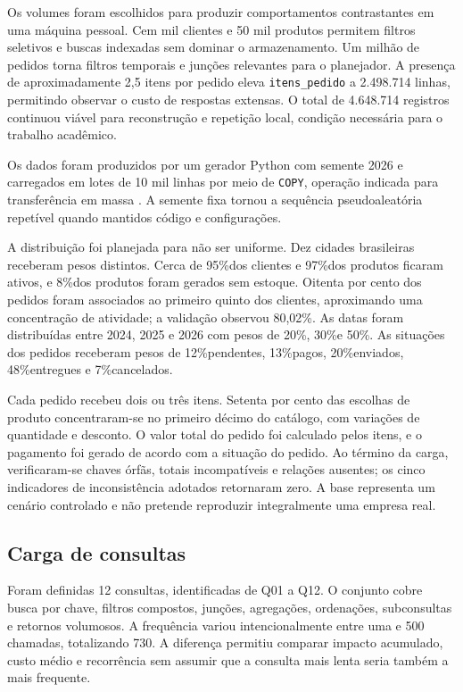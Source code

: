 \documentclass{UNESC}
\newcommand{\codigo}[1]{\texttt{#1}}
\newcommand{\perc}{\%}
\begin{document}
Os volumes foram escolhidos para produzir comportamentos contrastantes em uma máquina pessoal. Cem mil clientes e 50 mil produtos permitem filtros seletivos e buscas indexadas sem dominar o armazenamento. Um milhão de pedidos torna filtros temporais e junções relevantes para o planejador. A presença de aproximadamente 2,5 itens por pedido eleva \codigo{itens\_pedido} a 2.498.714 linhas, permitindo observar o custo de respostas extensas. O total de 4.648.714 registros continuou viável para reconstrução e repetição local, condição necessária para o trabalho acadêmico.

Os dados foram produzidos por um gerador Python com semente 2026 e carregados em lotes de 10 mil linhas por meio de \codigo{COPY}, operação indicada para transferência em massa \cite{postgresql2026copy}. A semente fixa tornou a sequência pseudoaleatória repetível quando mantidos código e configurações.

A distribuição foi planejada para não ser uniforme. Dez cidades brasileiras receberam pesos distintos. Cerca de 95\perc dos clientes e 97\perc dos produtos ficaram ativos, e 8\perc dos produtos foram gerados sem estoque. Oitenta por cento dos pedidos foram associados ao primeiro quinto dos clientes, aproximando uma concentração de atividade; a validação observou 80,02\perc. As datas foram distribuídas entre 2024, 2025 e 2026 com pesos de 20\perc, 30\perc e 50\perc. As situações dos pedidos receberam pesos de 12\perc pendentes, 13\perc pagos, 20\perc enviados, 48\perc entregues e 7\perc cancelados.

Cada pedido recebeu dois ou três itens. Setenta por cento das escolhas de produto concentraram-se no primeiro décimo do catálogo, com variações de quantidade e desconto. O valor total do pedido foi calculado pelos itens, e o pagamento foi gerado de acordo com a situação do pedido. Ao término da carga, verificaram-se chaves órfãs, totais incompatíveis e relações ausentes; os cinco indicadores de inconsistência adotados retornaram zero. A base representa um cenário controlado e não pretende reproduzir integralmente uma empresa real.

\subsection{Carga de consultas}

Foram definidas 12 consultas, identificadas de Q01 a Q12. O conjunto cobre busca por chave, filtros compostos, junções, agregações, ordenações, subconsultas e retornos volumosos. A frequência variou intencionalmente entre uma e 500 chamadas, totalizando 730. A diferença permitiu comparar impacto acumulado, custo médio e recorrência sem assumir que a consulta mais lenta seria também a mais frequente.
\end{document}
